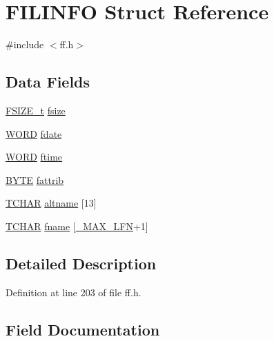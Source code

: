 \hypertarget{structFILINFO}{}\section{F\+I\+L\+I\+N\+FO Struct Reference}
\label{structFILINFO}


{\ttfamily \#include $<$ff.\+h$>$}

\subsection*{Data Fields}
\begin{DoxyCompactItemize}
\item 
\hyperlink{ff_8h_a3fc0992ad7436250b6b1a0592214b7f2}{F\+S\+I\+Z\+E\+\_\+t} \hyperlink{structFILINFO_a9e5b78ed7190f73de3ebcbdfbd6d1844}{fsize}
\item 
\hyperlink{integer_8h_a197942eefa7db30960ae396d68339b97}{W\+O\+RD} \hyperlink{structFILINFO_a7c01c48a15b1b49da459924437b0bd52}{fdate}
\item 
\hyperlink{integer_8h_a197942eefa7db30960ae396d68339b97}{W\+O\+RD} \hyperlink{structFILINFO_ae0f751b79621bf7b29669f177bbe6b9a}{ftime}
\item 
\hyperlink{integer_8h_a4ae1dab0fb4b072a66584546209e7d58}{B\+Y\+TE} \hyperlink{structFILINFO_a838d542585831b085537b363f18205c0}{fattrib}
\item 
\hyperlink{ff_8h_a03bdb8ce5895c7e261aadc2529637546}{T\+C\+H\+AR} \hyperlink{structFILINFO_a37243296fadacbde8500b5668d99682e}{altname} \mbox{[}13\mbox{]}
\item 
\hyperlink{ff_8h_a03bdb8ce5895c7e261aadc2529637546}{T\+C\+H\+AR} \hyperlink{structFILINFO_a7c3ce2dd03dc9a9726967fc43116079f}{fname} \mbox{[}\hyperlink{ffconf_8h_a14e73a5c703a586c614b3e40b849f82c}{\+\_\+\+M\+A\+X\+\_\+\+L\+FN}+1\mbox{]}
\end{DoxyCompactItemize}


\subsection{Detailed Description}


Definition at line 203 of file ff.\+h.



\subsection{Field Documentation}
